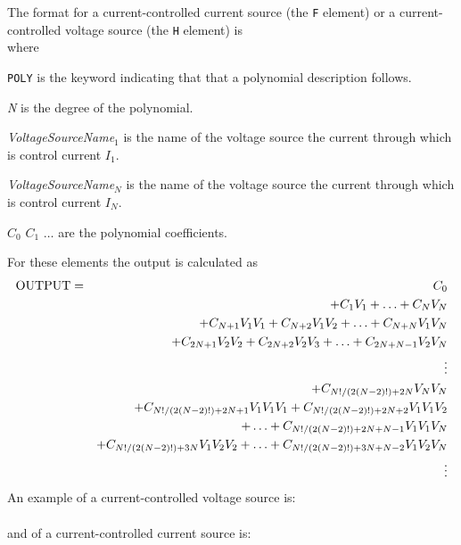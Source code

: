 The format for a current-controlled current source (the {\tt F} element)
or a current-controlled voltage source (the {\tt H} element) is\\[0.1in]
\hspace*{\fill}
where
\begin{widelist}
\item[{\tt POLY}] is the keyword indicating that that a polynomial description
follows.
\item[{\it N}] is the degree of the polynomial.
\item[{\it VoltageSourceName$_1$}] is the name of the voltage source the
current through which is control current $I_1$.
\item[{\it VoltageSourceName$_N$}] is the name of the voltage source the
current through which is control current $I_N$.
\item[$C_0$ $C_1$ $\ldots$] are the polynomial coefficients.
\end{widelist}
For these elements the output is calculated as
\begin{eqnarray}
{\rm OUTPUT} & = & C_0 \nonumber\\
         &   & + C_1V_1 + \ldots + C_NV_N\nonumber\\
         &   & + C_{N+1}V_1V_1 + C_{N+2}V_1V_2 + \ldots + C_{N+N}V_1V_N
             \nonumber\\
         &   & + C_{2N+1}V_2V_2 + C_{2N+2}V_2V_3 +\ldots + C_{2N+N-1}V_2V_N
             \nonumber\\
         &   & \vdots
             \nonumber\\
         &   & + C_{N!/(2(N-2)!)+2N}V_NV_N
             \nonumber\\
         &   & + C_{N!/(2(N-2)!)+2N+1}V_1V_1V_1 +
               C_{N!/(2(N-2)!)+2N+2}V_1V_1V_2\\
         &   & \ \ \ \ \ \ \ + \ldots +
               C_{N!/(2(N-2)!)+2N+N-1}V_1V_1V_N
                   \nonumber\\
         &   & + C_{N!/(2(N-2)!)+3N}V_1V_2V_2 + \ldots +
               C_{N!/(2(N-2)!)+3N+N-2}V_1V_2V_N
                   \nonumber\\
         &   & \vdots
\end{eqnarray}
An example of a current-controlled voltage source is:\\[0.1in]
\hspace*{\fill}
  \\[0.1in]
and of a current-controlled current source is:\\[0.1in]
\hspace*{\fill}

